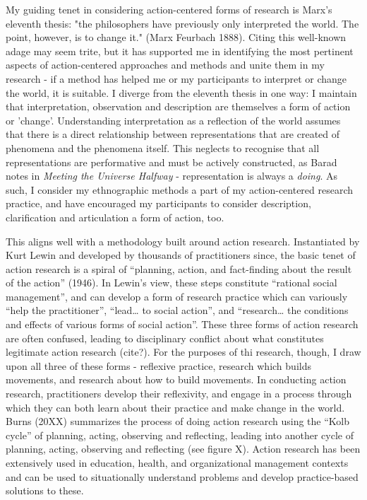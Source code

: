 
My guiding tenet in considering action-centered forms of research is Marx's eleventh thesis: 
"the philosophers have previously only interpreted the world. The point, however, is to change it." (Marx Feurbach 1888). 
Citing this well-known adage may seem trite, but it has supported me in identifying the most pertinent aspects of action-centered approaches and methods and unite them in my research - if a method has helped me or my participants to interpret or change the world, it is suitable. I diverge from the eleventh thesis in one way: I maintain that interpretation, observation and description are themselves a form of action or 'change'. Understanding interpretation as a reflection of the world assumes that there is a direct relationship between representations that are created of phenomena and the phenomena itself. This neglects to recognise that all representations are performative and must be actively constructed, as Barad notes in \textit{Meeting the Universe Halfway} \cite{barad_meeting_2007} - representation is always a \textit{doing}. As such, I consider my ethnographic methods a part of my action-centered research practice, and have encouraged my participants to consider description, clarification and articulation a form of action, too.

This aligns well with a methodology built around action research. Instantiated by Kurt Lewin and developed by thousands of practitioners since, the basic tenet of action research is a spiral of “planning, action, and fact-finding about the result of the action” (1946). In Lewin’s view, these steps constitute “rational social management”, and can develop a form of research practice which can variously “help the practitioner”, “lead… to social action”, and “research… the conditions and effects of various forms of social action”. These three forms of action research are often confused, leading to disciplinary conflict about what constitutes legitimate action research (cite?). For the purposes of thi research, though, I draw upon all three of these forms - reflexive practice, research which builds movements, and research about how to build movements. In conducting action research, practitioners develop their reflexivity, and engage in a process through which they can both learn about their practice and make change in the world. Burns (20XX) summarizes the process of doing action research using the “Kolb cycle” of planning, acting, observing and reflecting, leading into another cycle of planning, acting, observing and reflecting (see figure X). Action research has been extensively used in education, health, and organizational management contexts and can be used to situationally understand problems and develop practice-based solutions to these.


